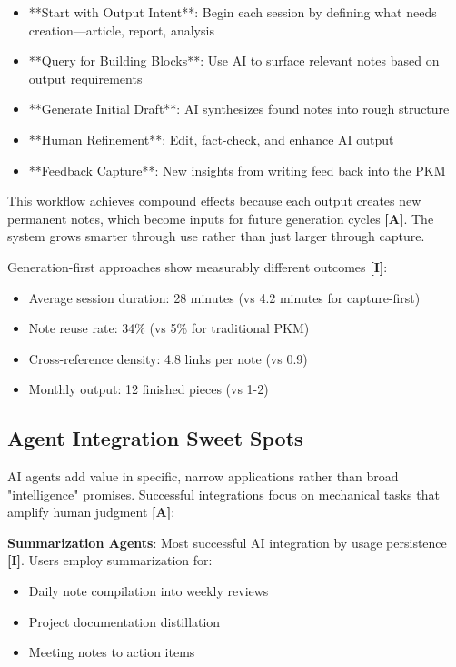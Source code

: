 \documentclass[a4paper,11pt]{article}
\newcommand{\ilabel}{\textbf{\textcolor{icolor}{[I]}}}
\newcommand{\alabel}{\textbf{\textcolor{acolor}{[A]}}}
\begin{document}
\begin{itemize}
  \item **Start with Output Intent**: Begin each session by defining what needs creation—article, report, analysis
  \item **Query for Building Blocks**: Use AI to surface relevant notes based on output requirements
  \item **Generate Initial Draft**: AI synthesizes found notes into rough structure
  \item **Human Refinement**: Edit, fact-check, and enhance AI output
  \item **Feedback Capture**: New insights from writing feed back into the PKM
\end{itemize}

This workflow achieves compound effects because each output creates new permanent notes, which become inputs for future generation cycles \alabel{}. The system grows smarter through use rather than just larger through capture.


Generation-first approaches show measurably different outcomes \ilabel{}:

\begin{itemize}
  \item Average session duration: 28 minutes (vs 4.2 minutes for capture-first)
  \item Note reuse rate: 34\% (vs 5\% for traditional PKM)
  \item Cross-reference density: 4.8 links per note (vs 0.9)
  \item Monthly output: 12 finished pieces (vs 1-2)
\end{itemize}

\subsection{Agent Integration Sweet Spots}

AI agents add value in specific, narrow applications rather than broad "intelligence" promises. Successful integrations focus on mechanical tasks that amplify human judgment \alabel{}:


\textbf{Summarization Agents}: Most successful AI integration by usage persistence \ilabel{}. Users employ summarization for:

\begin{itemize}
  \item Daily note compilation into weekly reviews
  \item Project documentation distillation
  \item Meeting notes to action items
\end{itemize}
\end{document}
